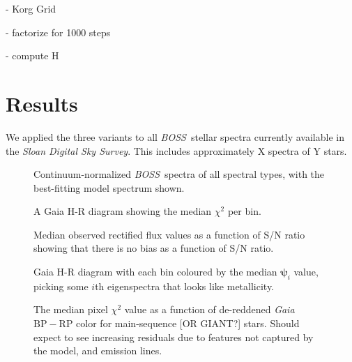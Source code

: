 \documentclass[modern]{aastex631}
\newcommand{\project}[1]{\textit{#1}}
\newcommand{\vectheta}{\boldsymbol{\theta}}
\newcommand{\vecpsi}{\boldsymbol{\psi}}
\newcommand{\boss}{\project{BOSS}}
\newcommand{\todo}[1]{\textcolor{tab:red}{#1}}
\begin{document}
- Korg Grid

- factorize for 1000 steps

- compute H



\section{Results}
\label{sec:results}

We applied the three variants to all \boss\ stellar spectra currently available in the \emph{Sloan Digital Sky Survey}. This includes approximately \todo{X} spectra of \todo{Y} stars. 


\begin{figure}
    \caption{Continuum-normalized \boss\ spectra of all spectral types, with the best-fitting model spectrum shown.}
\end{figure}



\begin{figure}
    \caption{A Gaia H-R diagram showing the median $\chi^2$ per bin.}
\end{figure}


\begin{figure}
    \caption{Median observed rectified flux values as a function of S/N ratio showing that there is no bias as a function of S/N ratio.}
\end{figure}


\begin{figure}
    \caption{Gaia H-R diagram with each bin coloured by the median $\vecpsi_i$ value, picking some $i$th eigenspectra that looks like metallicity. \label{fig:gaia_hrd_metallicity}}
\end{figure}


\begin{figure*}
    \caption{The median pixel $\chi^2$ value as a function of de-reddened \emph{Gaia} $\mathrm{BP} - \mathrm{RP}$ color for main-sequence [OR GIANT?] stars. \todo{Should expect to see increasing residuals due to features not captured by the model, and emission lines.}}
\end{figure*}
\end{document}
